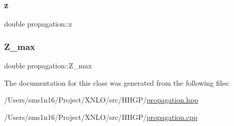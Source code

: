 \mbox{\label{classpropagation_aeacfc091fafd1fdb1af4536f6f587e55}} 
\subsubsection{\texorpdfstring{z}{z}}
{\footnotesize\ttfamily double propagation\+::z}

\mbox{\label{classpropagation_ae0b2d1a8fa0e59d37e124a0ba1f12dd2}} 
\subsubsection{\texorpdfstring{Z\_max}{Z\_max}}
{\footnotesize\ttfamily double propagation\+::\+Z\+\_\+max\hspace{0.3cm}{\ttfamily [private]}}



The documentation for this class was generated from the following files\+:\begin{DoxyCompactItemize}
\item 
/\+Users/sms1n16/\+Project/\+X\+N\+L\+O/src/\+H\+H\+G\+P/\mbox{\hyperlink{propagation_8hpp}{propagation.\+hpp}}\item 
/\+Users/sms1n16/\+Project/\+X\+N\+L\+O/src/\+H\+H\+G\+P/\mbox{\hyperlink{propagation_8cpp}{propagation.\+cpp}}\end{DoxyCompactItemize}
